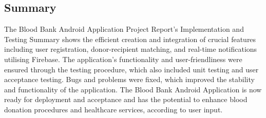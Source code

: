 \subsection{Summary}
The Blood Bank Android Application Project Report's Implementation and Testing Summary shows the efficient creation and integration of crucial features including user registration, donor-recipient matching, and real-time notifications utilising Firebase. The application's functionality and user-friendliness were ensured through the testing procedure, which also included unit testing and user acceptance testing. Bugs and problems were fixed, which improved the stability and functionality of the application. The Blood Bank Android Application is now ready for deployment and acceptance and has the potential to enhance blood donation procedures and healthcare services, according to user input.
